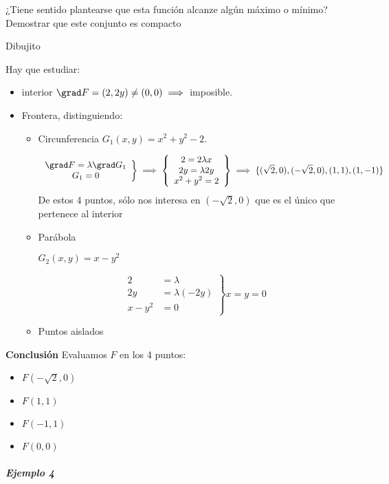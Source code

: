 ¿Tiene sentido plantearse que esta función alcanze algún máximo o mínimo? 
Demostrar que este conjunto es compacto
 
 Dibujito
 
 Hay que estudiar:
 \begin{itemize}
 \item interior $\grad F = (2,2y) \neq (0,0) \implies$ imposible.
 \item Frontera, distinguiendo:
 \begin{itemize}
 \item Circunferencia
 	$G_1(x,y) = x^2+y^2-2$.
 	
 	\[\left.\begin{array}{cc}
 	\grad F = \lambda \grad G_1\\
 	G_1 = 0\end{array} \right\}\implies \left\{\begin{array}{c}
 	2 = 2\lambda x\\
 	2y = \lambda 2y\\
 	x^2+y^2=2\end{array} \right\} \implies \{(\sqrt{2},0),(-\sqrt{2},0),(1,1),(1,-1)\} \]
 	De estos 4 puntos, sólo nos interesa en $(-\sqrt{2},0)$ que es el único que pertenece al interior
 \item Parábola
 
 $G_2(x,y) = x-y^2$
 
 \[\left.\begin{array}{cc}
 2 &= \lambda\\
 2y &= \lambda (-2y)\\
 x-y^2 &=0\end{array}\right\} x=y=0\]
 \item Puntos aislados
 \end{itemize}
 \end{itemize}

\textbf{Conclusión} Evaluamos $F$ en los 4 puntos:

\begin{itemize}
\item $F(-\sqrt{2},0)$
\item $F(1,1)$
\item $F(-1,1)$
\item $F(0,0)$
\end{itemize}

\subparagraph{Ejemplo 4}

